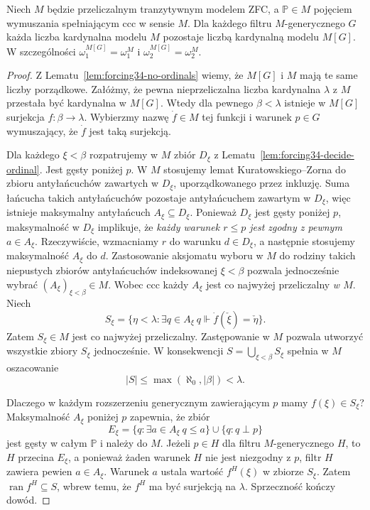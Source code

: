 \begin{twierdzenie}
\label{thm:forcing34-ccc-preserves}
Niech $M$ będzie przeliczalnym
tranzytywnym modelem ZFC,
a $\mathbb P\in M$ pojęciem
wymuszania spełniającym ccc
w sensie $M$. Dla każdego filtru
$M$-generycznego $G$ każda
liczba kardynalna modelu $M$
pozostaje liczbą kardynalną
modelu $M[G]$. W szczególności
$\omega_1^{M[G]}=\omega_1^M$
i $\omega_2^{M[G]}=\omega_2^M$.
\end{twierdzenie}
\begin{proof}
Z Lematu~\ref{lem:forcing34-no-ordinals}
wiemy, że $M[G]$ i $M$
mają te same liczby porządkowe.
Załóżmy, że pewna nieprzeliczalna
liczba kardynalna $\lambda$ z $M$
przestała być kardynalna w $M[G]$.
Wtedy dla pewnego $\beta<\lambda$
istnieje w $M[G]$ surjekcja
$f:\beta\to\lambda$.
Wybierzmy nazwę $\dot f\in M$
tej funkcji i warunek $p\in G$
wymuszający, że $\dot f$ jest
taką surjekcją.

Dla każdego $\xi<\beta$
rozpatrujemy w $M$ zbiór
$D_\xi$ z Lematu~\ref{lem:forcing34-decide-ordinal}.
Jest gęsty poniżej $p$.
W $M$ stosujemy lemat
Kuratowskiego--Zorna do zbioru
antyłańcuchów zawartych w
$D_\xi$, uporządkowanego
przez inkluzję. Suma łańcucha
takich antyłańcuchów pozostaje
antyłańcuchem zawartym w
$D_\xi$, więc istnieje
maksymalny antyłańcuch
$A_\xi\subseteq D_\xi$.
Ponieważ $D_\xi$ jest gęsty
poniżej $p$, maksymalność
w $D_\xi$ implikuje, że
\emph{każdy warunek $r\leq p$
jest zgodny z pewnym $a\in A_\xi$}.
Rzeczywiście, wzmacniamy $r$
do warunku $d\in D_\xi$,
a następnie stosujemy
maksymalność $A_\xi$ do $d$.
Zastosowanie aksjomatu wyboru
w $M$ do rodziny takich
niepustych zbiorów antyłańcuchów
indeksowanej $\xi<\beta$
pozwala jednocześnie wybrać
$(A_\xi)_{\xi<\beta}\in M$.
Wobec ccc każdy $A_\xi$
jest co najwyżej przeliczalny
\emph{w $M$}. Niech
\[
 S_\xi=\{\eta<\lambda:
  \exists q\in A_\xi\
  q\Vdash\dot f(\check\xi)=\check\eta\}.
\]
Zatem $S_\xi\in M$ jest co najwyżej
przeliczalny. Zastępowanie w $M$
pozwala utworzyć wszystkie
zbiory $S_\xi$ jednocześnie.
W konsekwencji
$S=\bigcup_{\xi<\beta}S_\xi$
spełnia w $M$ oszacowanie
\[
 |S|\leq\max(\aleph_0,|\beta|)<\lambda.
\]

Dlaczego w każdym rozszerzeniu
generycznym zawierającym $p$
mamy $f(\xi)\in S_\xi$?
Maksymalność $A_\xi$ poniżej
$p$ zapewnia, że zbiór
\[
 E_\xi=\{q:\exists a\in A_\xi\
              q\leq a\}
       \cup\{q:q\perp p\}
\]
jest gęsty w całym $\mathbb P$
i należy do $M$.
Jeżeli $p\in H$ dla filtru
$M$-generycznego $H$,
to $H$ przecina $E_\xi$,
a ponieważ żaden warunek
$H$ nie jest niezgodny z $p$,
filtr $H$ zawiera pewien
$a\in A_\xi$. Warunek $a$
ustala wartość $f^H(\xi)$
w zbiorze $S_\xi$.
Zatem
$\operatorname{ran}f^H\subseteq S$,
wbrew temu, że $f^H$ ma być
surjekcją na $\lambda$.
Sprzeczność kończy dowód.


\end{proof}
